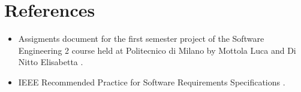 \section{References}

\begin{itemize}
	\item Assigments document for the first semester project of the Software Engineering 2 course held at Politecnico di Milano by Mottola Luca and Di Nitto Elisabetta \cite{assignments}.
	\item IEEE Recommended Practice for Software Requirements Specifications \cite{ieee-srs}.
\end{itemize}
